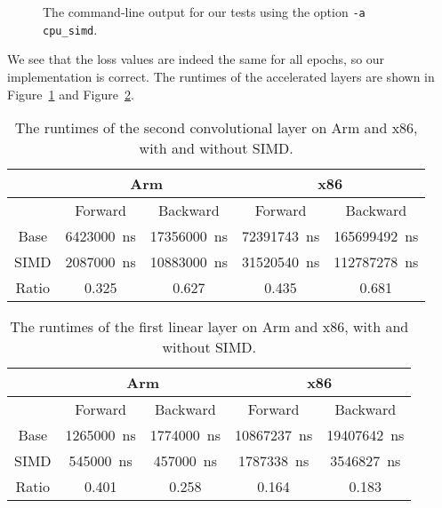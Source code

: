 \documentclass{article}
\numberwithin{equation}{section}
\numberwithin{figure}{section}
\numberwithin{table}{section}
\begin{document}
    \begin{figure}[htb]
        \inputminted{shell-session}{21mnist/cmd_output/Arm_cpu_simd.txt}
        \caption{The command-line output for our tests using the option \texttt{-a cpu_simd}.}
        \label{results:fig:cpu_simd}
    \end{figure}

    We see that the loss values are indeed the same for all epochs, so our implementation is correct. The runtimes of
    the accelerated layers are shown in Figure~\ref{results:tab:runtimes_convolution} and
    Figure~\ref{results:tab:runtimes_linear}.

    \begin{table}[htb]
        \begin{center}
            \begin{tabular}{c|cccc}
                & \multicolumn{2}{c}{Arm} & \multicolumn{2}{c}{x86} \\ \hline
                & Forward & Backward & Forward & Backward \\ \hline
                Base  & \SI{6423000}{\nano\second} & \SI{17356000}{\nano\second} & \SI{72391743}{\nano\second} & \SI{165699492}{\nano\second} \\
                SIMD  & \SI{2087000}{\nano\second} & \SI{10883000}{\nano\second} & \SI{31520540}{\nano\second} & \SI{112787278}{\nano\second} \\ \hline
                Ratio & \num{0.325}                & \num{0.627}                 & \num{0.435}                 & \num{0.681}
            \end{tabular}
        \end{center}
        \caption{The runtimes of the second convolutional layer on Arm and x86, with and without SIMD.}
        \label{results:tab:runtimes_convolution}
    \end{table}

    \begin{table}[htb]
        \begin{center}
            \begin{tabular}{c|cccc}
                & \multicolumn{2}{c}{Arm} & \multicolumn{2}{c}{x86} \\ \hline
                & Forward & Backward & Forward & Backward \\ \hline
                Base  & \SI{1265000}{\nano\second} & \SI{1774000}{\nano\second} & \SI{10867237}{\nano\second} & \SI{19407642}{\nano\second} \\
                SIMD  & \SI{545000}{\nano\second}  & \SI{457000}{\nano\second}  & \SI{1787338}{\nano\second}  & \SI{3546827}{\nano\second}  \\ \hline
                Ratio & \num{0.401}                & \num{0.258}                & \num{0.164}                 & \num{0.183}
            \end{tabular}
        \end{center}
        \caption{The runtimes of the first linear layer on Arm and x86, with and without SIMD.}
        \label{results:tab:runtimes_linear}
    \end{table}
\end{document}

